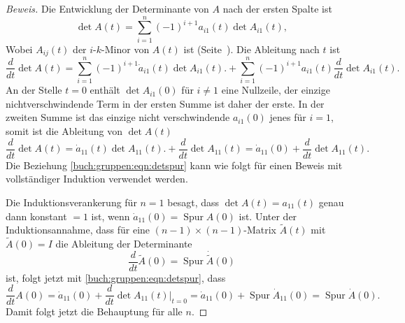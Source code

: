 \begin{proof}[Beweis]
Die Entwicklung der Determinante von $A$ nach der ersten Spalte ist
\[
\det A(t) = \sum_{i=1}^n (-1)^{i+1} a_{i1}(t) \det A_{i1}(t),
\]
Wobei $A_{i\!j}(t)$ der $i$-$k$-Minor von $A(t)$ ist
(Seite~\pageref{buch:linear:def:minor}).
Die Ableitung nach $t$ ist
\[
\frac{d}{dt} \det A(t)
=
\sum_{i=1}^n (-1)^{i+1} \dot{a}_{i1}(t) \det A_{i1}(t).
+
\sum_{i=1}^n (-1)^{i+1} a_{i1}(t) \frac{d}{dt}\det A_{i1}(t).
\]
An der Stelle $t=0$ enthält $\det A_{i1}(0)$ für $i\ne 1$
eine Nullzeile, der einzige nichtverschwindende Term in der ersten
Summe ist daher der erste.
In der zweiten Summe ist das einzige nicht verschwindende $a_{i1}(0)$
jenes für $i=1$, somit ist die Ableitung von $\det A(t)$
\begin{equation}
\frac{d}{dt} \det A(t)
=
\dot{a}_{11}(t) \det A_{11}(t).
+
\frac{d}{dt}\det A_{11}(t)
=
\dot{a}_{11}(0) 
+
\frac{d}{dt}\det A_{11}(t).
\label{buch:gruppen:eqn:detspur}
\end{equation}
Die Beziehung \eqref{buch:gruppen:eqn:detspur} kann wie folgt
für einen Beweis mit vollständiger Induktion verwendet werden.

Die Induktionsverankerung für $n=1$ besagt, dass $\det A(t)=a_{11}(t)$
genau dann konstant $=1$ ist, wenn $\dot{a}_{11}(0)=\operatorname{Spur}A(0)$
ist.
Unter der Induktionsannahme, dass für eine $(n-1)\times(n-1)$-Matrix
$\tilde{A}(t)$ mit $\tilde{A}(0)=I$ die Ableitung der Determinante
\[
\frac{d}{dt}\tilde{A}(0)
=
\operatorname{Spur}\dot{\tilde{A}}(0)
\]
ist, folgt jetzt mit
\eqref{buch:gruppen:eqn:detspur}, dass
\[
\frac{d}{dt}A(0)
=
\dot{a}_{11}(0)
+
\frac{d}{dt} \det A_{11}(t)\bigg|_{t=0}
=
\dot{a}_{11}(0)
+
\operatorname{Spur}\dot{A}_{11}(0)
=
\operatorname{Spur}\dot{A}(0).
\]
Damit folgt jetzt die Behauptung für alle $n$.
\end{proof}

